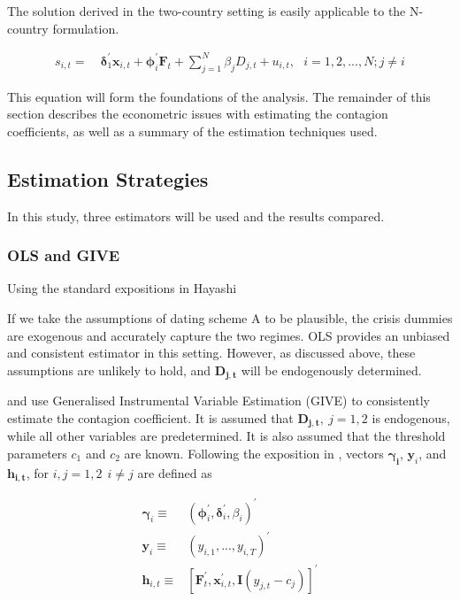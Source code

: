 \documentclass[../base.tex]{subfiles}
\begin{document}
The solution derived in the two-country setting is easily applicable to the N-country formulation. 

\begin{align}
	s_{i,t} =&~\mathbf{\delta}_1^{\prime} \mathbf{x}_{i,t} + \mathbf{\phi}_i^{\prime} \mathbf{F}_t + \sum_{j=1}^{N}\beta_j D_{j,t} + u_{i,t}, ~~~ i = 1,2,...,N ; j \neq i
	\label{eqn:pp_multi}	
\end{align}

This equation will form the foundations of the analysis. The remainder of this section describes the econometric issues with estimating the contagion coefficients, as well as a summary of the estimation techniques used. 


\subsection{Estimation Strategies}
\label{est_strat}

In this study, three estimators will be used and the results compared. 

\subsubsection{OLS and GIVE}

Using the standard expositions in Hayashi

If we take the assumptions of dating scheme A to be plausible, the crisis dummies are exogenous and accurately capture the two regimes. OLS provides an unbiased and consistent estimator in this setting. However, as discussed above, these assumptions are unlikely to hold, and $\mathbf{D_{j,t}}$ will be endogenously determined. 

\cite{pesaran2007econometric} and \cite{metiu2012sovereign} use Generalised Instrumental Variable Estimation (GIVE) to consistently estimate the contagion coefficient. It is assumed that $\mathbf{D_{j,t}},~ j = 1, 2$ is endogenous, while all other variables are predetermined. It is also assumed that the threshold parameters $c_1$ and $c_2$ are known. Following the exposition in \cite{massacci2007identification}, vectors $\mathbf{\gamma_i}$, $\mathbf{y}_i$, and $\mathbf{h_{i,t}}$, for $i,j = 1,2 ~~ i \neq j$ are defined as 

\begin{align*}
 \mathbf{\gamma}_i \equiv& (\mathbf{\phi}_i^{\prime}, \mathbf{\delta}_{i}^{\prime}, \beta_i)^{\prime} \\
 \mathbf{y}_i \equiv& (y_{i,1},...,y_{i,T})^{\prime}\\
 \mathbf{h}_{i,t} \equiv& [\mathbf{F}_t^{\prime}, \mathbf{x}_{i,t}^{\prime}, \mathbf{I}(y_{j,t} - c_j)]^{\prime}
\end{align*}
\end{document}
